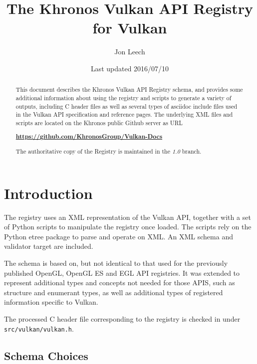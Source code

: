 \documentclass{article}
\begin{document}
\title{The Khronos Vulkan API Registry for Vulkan}
\author{Jon Leech}
\date{Last updated 2016/07/10}
\maketitle

\begin{abstract}

This document describes the Khronos Vulkan API Registry schema, and provides
some additional information about using the registry and scripts to generate
a variety of outputs, including C header files as well as several types of
asciidoc include files used in the Vulkan API specification and reference
pages. The underlying XML files and scripts are located on the Khronos
public Github server as URL

\begin{center}
{\bf \href{https://github.com/KhronosGroup/Vulkan-Docs}
          {https://github.com/KhronosGroup/Vulkan-Docs}}
\end{center}

The authoritative copy of the Registry is maintained in the {\em 1.0}
branch.

\end{abstract}

\tableofcontents

\section{Introduction}

The registry uses an XML representation of the Vulkan API, together with a
set of Python scripts to manipulate the registry once loaded. The scripts
rely on the Python etree package to parse and operate on XML. An XML schema
and validator target are included.

The schema is based on, but not identical to that used for the previously
published OpenGL, OpenGL ES and EGL API registries. It was extended to
represent additional types and concepts not needed for those APIS, such as
structure and enumerant types, as well as additional types
of registered information specific to Vulkan.

The processed C header file corresponding to the registry is checked in
under {\tt src/vulkan/vulkan.h}.


\subsection{Schema Choices}
\end{document}
